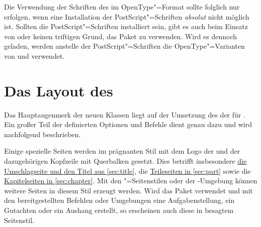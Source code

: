 Die Verwendung der Schriften des \CDs im OpenType"=Format sollte folglich nur 
erfolgen, wenn eine Installation der PostScript"=Schriften \emph{absolut} nicht 
möglich ist. Sollten die PostScript"=Schriften installiert sein, gibt es auch 
beim Einsatz von  oder  keinen triftigen 
Grund, das Paket  zu verwenden. Wird es dennoch geladen, 
werden anstelle der PostScript"=Schriften die OpenType"=Varianten von \Univers 
und \DIN verwendet.



\section{Das Layout des \CDs}
Das Hauptaugenmerk der neuen Klassen liegt auf der Umsetzung des \CDs der
\TnUD für . Ein großer Teil der definierten Optionen und Befehle
dient genau dazu und wird nachfolgend beschrieben.

Einige spezielle Seiten werden im prägnanten Stil mit dem Logo der \TnUD und 
der dazugehörigen Kopfzeile mit Querbalken gesetzt. Dies betrifft insbesondere 
\hyperref[sec:title]{die Umschlagseite und den Titel aus \autoref{sec:title}}, 
die \hyperref[sec:part]{Teileseiten in \autoref{sec:part}} sowie die
\hyperref[sec:chapter]{Kapitelseiten in \autoref{sec:chapter}}. Mit den 
"=Seitenstilen oder der -Umgebung  
können weitere Seiten in diesem Stil erzeugt werden. Wird das Paket 
 verwendet und mit den bereitgestellten Befehlen oder 
Umgebungen eine Aufgabenstellung, ein Gutachten oder ein Aushang erstellt, so 
erscheinen auch diese in besagtem Seitenstil.


